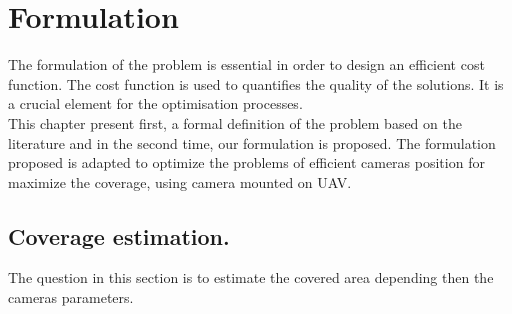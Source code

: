 \chapter{Formulation}
\minitoc
The formulation of the problem is essential in order to design an efficient cost function. The cost function is  used to quantifies the quality of the solutions. It is a crucial element for the optimisation processes.\\
This chapter present first, a formal definition  of the problem based on the literature and in the second time, our formulation is proposed. The formulation proposed is adapted to optimize the problems of efficient cameras position for maximize the coverage, using camera mounted on UAV.

\section{ Coverage estimation. }


 The question in this section is to estimate the covered area depending then the cameras parameters.\\



